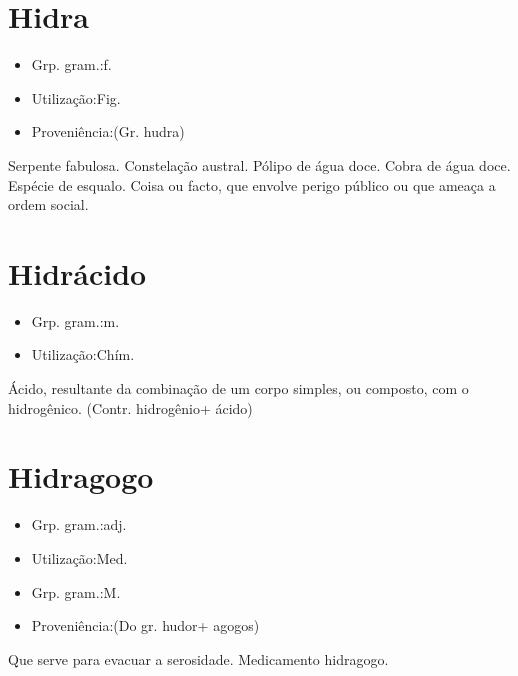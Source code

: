 \documentclass{article}
\begin{document}
\section{Hidra}
\begin{itemize}
\item {Grp. gram.:f.}
\end{itemize}
\begin{itemize}
\item {Utilização:Fig.}
\end{itemize}
\begin{itemize}
\item {Proveniência:(Gr. \textunderscore hudra\textunderscore )}
\end{itemize}
Serpente fabulosa.
Constelação austral.
Pólipo de água doce.
Cobra de água doce.
Espécie de esqualo.
Coisa ou facto, que envolve perigo público ou que ameaça a ordem social.
\section{Hidrácido}
\begin{itemize}
\item {Grp. gram.:m.}
\end{itemize}
\begin{itemize}
\item {Utilização:Chím.}
\end{itemize}
Ácido, resultante da combinação de um corpo simples, ou composto, com o hidrogênico.
(Contr. \textunderscore hidrogênio\textunderscore  + \textunderscore ácido\textunderscore )
\section{Hidragogo}
\begin{itemize}
\item {Grp. gram.:adj.}
\end{itemize}
\begin{itemize}
\item {Utilização:Med.}
\end{itemize}
\begin{itemize}
\item {Grp. gram.:M.}
\end{itemize}
\begin{itemize}
\item {Proveniência:(Do gr. \textunderscore hudor\textunderscore  + \textunderscore agogos\textunderscore )}
\end{itemize}
Que serve para evacuar a serosidade.
Medicamento hidragogo.
\end{document}
